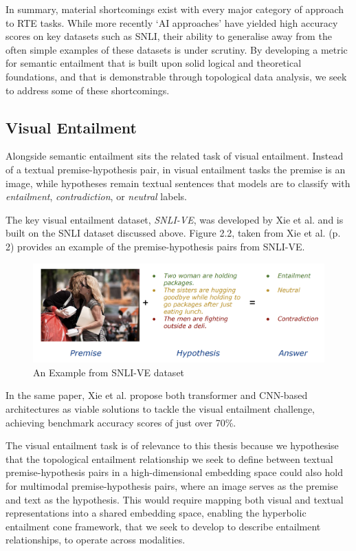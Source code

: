 \documentclass[12pt,twoside]{report}
\begin{document}
In summary, material shortcomings exist with every major category of approach to RTE tasks. While more recently `AI approaches' have yielded high accuracy scores on key datasets such as SNLI, their ability to generalise away from the often simple examples of these datasets is under scrutiny. By developing a metric for semantic entailment that is built upon solid logical and theoretical foundations, and that is demonstrable through topological data analysis, we seek to address some of these shortcomings.

\subsection{Visual Entailment}

Alongside semantic entailment sits the related task of visual entailment. Instead of a textual premise-hypothesis pair, in visual entailment tasks the premise is an image, while hypotheses remain textual sentences that models are to classify with \textit{entailment}, \textit{contradiction}, or \textit{neutral} labels. \newline \par

The key visual entailment dataset, \textit{SNLI-VE}, was developed by Xie et al.\cite{xie2019visualentailmentnoveltask} and is built on the SNLI dataset discussed above. Figure 2.2, taken from Xie et al. (p. 2) \cite{xie2019visualentailmentnoveltask} provides an example of the premise-hypothesis pairs from SNLI-VE. 

\begin{figure}[H]
\centering
\includegraphics[width = 0.5\hsize]{./figures/SNLI-VE.png}
\caption{An Example from SNLI-VE dataset}
\label{fig:SNLI-VE}
\end{figure}

In the same paper, Xie et al. propose both transformer and CNN-based architectures as viable solutions to tackle the visual entailment challenge, achieving benchmark accuracy scores of just over 70\%.

The visual entailment task is of relevance to this thesis because we hypothesise that the topological entailment relationship we seek to define between textual premise-hypothesis pairs in a high-dimensional embedding space could also hold for multimodal premise-hypothesis pairs, where an image serves as the premise and text as the hypothesis. This would require mapping both visual and textual representations into a shared embedding space, enabling the hyperbolic entailment cone framework, that we seek to develop to describe entailment relationships, to operate across modalities.
\end{document}

